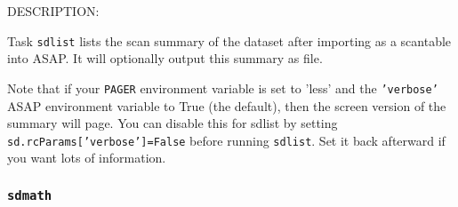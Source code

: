     DESCRIPTION:
    
    Task {\tt sdlist} lists the scan summary of the dataset after importing
    as a scantable into ASAP.  It will optionally output this summary
    as file.
    
    Note that if your {\tt PAGER} environment variable is set to 'less' and
    the {\tt 'verbose'} ASAP environment variable to True
    (the default), then the screen version of the summary will page.
    You can disable this for sdlist by setting
         {\tt sd.rcParams['verbose']=False}
    before running {\tt sdlist}.  Set it back afterward if you want lots
    of information.

\subsubsection{{\tt sdmath}}
\label{section:sd.sdtasks.tasks.sdmath}

